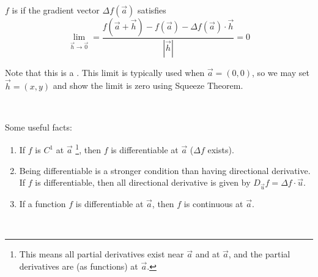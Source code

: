 \documentclass[11pt,fleqn]{book} %
\begin{document}

\begin{definition}[Differentiable]
    $f$ is  if the gradient vector $\Delta f(\vec{a})$ satisfies $$\lim_{\vec{h} \to \vec{0}} = \frac{f(\vec{a} + \vec{h}) - f(\vec{a}) - \Delta f(\vec{a}) \cdot \vec{h}}{| \vec{h} |} = 0$$
\end{definition}

Note that this is a . This limit is typically used when $\vec{a} = (0, 0)$, so we may set $\vec{h} = (x, y)$ and show the limit is zero using Squeeze Theorem.

{~~~}

Some useful facts:

\begin{enumerate}
    \item If $f$ is $C^1$ at $\vec{a}$ \footnote{This means all partial derivatives exist near $\vec{a}$ and at $\vec{a}$, and the partial derivatives are  (as functions) at $\vec{a}$. }, then $f$ is differentiable at $\vec{a}$ ($\Delta f$ exists). 

    \item Being differentiable is a stronger condition than having directional derivative. If $f$ is differentiable, then all directional derivative is given by $D_{\vec{u}} f = \Delta f \cdot \vec{u}$. 

    \item If a function $f$ is differentiable at $\vec{a}$, then $f$ is continuous at $\vec{a}$.
\end{enumerate}

{~~~}
\end{document}
